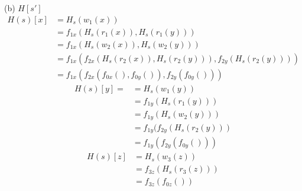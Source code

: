\documentclass[12pt]{article}
\begin{document}
(b) $H[s']$
\begin{equation*}
    \begin{split}
        H(s)[x] &= H_s(w_1(x)) \\
        &= f_{1x}(H_s(r_1(x)), H_s(r_1(y))) \\
        &= f_{1x}(H_s(w_2(x)), H_s(w_2(y))) \\
        &= f_{1x}(f_{2x}(H_s(r_2(x)), H_s(r_2(y))), f_{2y}(H_s(r_2(y)))) \\
        &= f_{1x}(f_{2x}(f_{0x}(), f_{0y}()), f_{2y}(f_{0y}()))
    \end{split}
\end{equation*}
\begin{equation*}
    \begin{split}
        H(s)[y] = &= H_s(w_1(y)) \\
        &= f_{1y}(H_s(r_1(y))) \\
        &= f_{1y}(H_s(w_2(y))) \\
        &= f_{1y}(f_{2y}(H_s(r_2(y))) \\
        &= f_{1y}(f_{2y}(f_{0y}()))
    \end{split}
\end{equation*}
\begin{equation*}
    \begin{split}
        H(s)[z] &= H_s(w_3(z)) \\
        &= f_{3z}(H_s(r_3(z))) \\
        &= f_{3z}(f_{0z}())
    \end{split}
\end{equation*}
\end{document}
